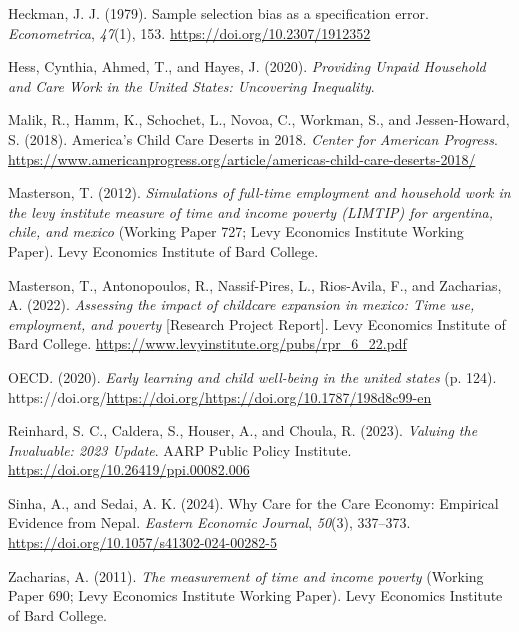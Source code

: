 \documentclass[
  11pt,
]{article}
\newlength{\cslhangindent}
\newenvironment{CSLReferences}[2] %
 {\begin{list}{}{%
  \setlength{\itemindent}{0pt}
  \setlength{\leftmargin}{0pt}
  \setlength{\parsep}{0pt}
  \ifodd #1
   \setlength{\leftmargin}{\cslhangindent}
   \setlength{\itemindent}{-1\cslhangindent}
  \fi
  \setlength{\itemsep}{#2\baselineskip}}}
 {\end{list}}
\begin{document}
\begin{CSLReferences}{1}{0}
Heckman, J. J. (1979). Sample selection bias as a specification error.
\emph{Econometrica}, \emph{47}(1), 153.
\url{https://doi.org/10.2307/1912352}

Hess, Cynthia, Ahmed, T., and Hayes, J. (2020). \emph{Providing {Unpaid}
{Household} and {Care} {Work} in the {United} {States}: {Uncovering}
{Inequality}}.

Malik, R., Hamm, K., Schochet, L., Novoa, C., Workman, S., and
Jessen-Howard, S. (2018). America's {Child} {Care} {Deserts} in 2018.
\emph{Center for American Progress}.
\url{https://www.americanprogress.org/article/americas-child-care-deserts-2018/}

Masterson, T. (2012). \emph{Simulations of full-time employment and
household work in the levy institute measure of time and income poverty
(LIMTIP) for argentina, chile, and mexico} (Working Paper 727; Levy
Economics Institute Working Paper). Levy Economics Institute of Bard
College.

Masterson, T., Antonopoulos, R., Nassif-Pires, L., Rios-Avila, F., and
Zacharias, A. (2022). \emph{Assessing the impact of childcare expansion
in mexico: Time use, employment, and poverty} {[}Research Project
Report{]}. Levy Economics Institute of Bard College.
\url{https://www.levyinstitute.org/pubs/rpr_6_22.pdf}

OECD. (2020). \emph{Early learning and child well-being in the united
states} (p. 124).
https://doi.org/\url{https://doi.org/https://doi.org/10.1787/198d8c99-en}

Reinhard, S. C., Caldera, S., Houser, A., and Choula, R. (2023).
\emph{Valuing the {Invaluable}: 2023 {Update}}. AARP Public Policy
Institute. \url{https://doi.org/10.26419/ppi.00082.006}

Sinha, A., and Sedai, A. K. (2024). Why {Care} for the {Care} {Economy}:
{Empirical} {Evidence} from {Nepal}. \emph{Eastern Economic Journal},
\emph{50}(3), 337--373. \url{https://doi.org/10.1057/s41302-024-00282-5}

Zacharias, A. (2011). \emph{The measurement of time and income poverty}
(Working Paper 690; Levy Economics Institute Working Paper). Levy
Economics Institute of Bard College.


\end{CSLReferences}
\end{document}
